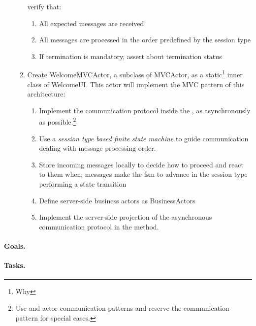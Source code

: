 \begin{enumerate}
\begin{enumerate}
    verify that:
    \begin{enumerate}
    \item All expected messages are received
    \item All messages are processed in the order predefined by the
      session type
    \item If termination is mandatory, assert about termination status
    \end{enumerate}
  \item Create WelcomeMVCActor, a subclass of MVCActor, as a
    static\footnote{Why } inner class of WelcomeUI. This
    actor will implement the MVC pattern of this architecture:
    \begin{enumerate}
    \item Implement the communication protocol inside the
      , as asynchronously as possible.\footnote{Use
         and  actor communication patterns
        and reserve the  communication pattern for special
        cases.}
    \item Use a \emph{session type based finite state machine} to
      guide communication dealing with message processing order.
    \item Store incoming messages locally to decide how to proceed and
      react to them when; messages make the fsm to advance in the
      session type performing a state transition
    \item Define server-side business actors as BusinessActors
    \item Implement the server-side projection of the asynchronous
      communication protocol in the  method.
    \end{enumerate}
  \end{enumerate}
\end{enumerate}

\paragraph{Goals.}


\paragraph{Tasks.}







